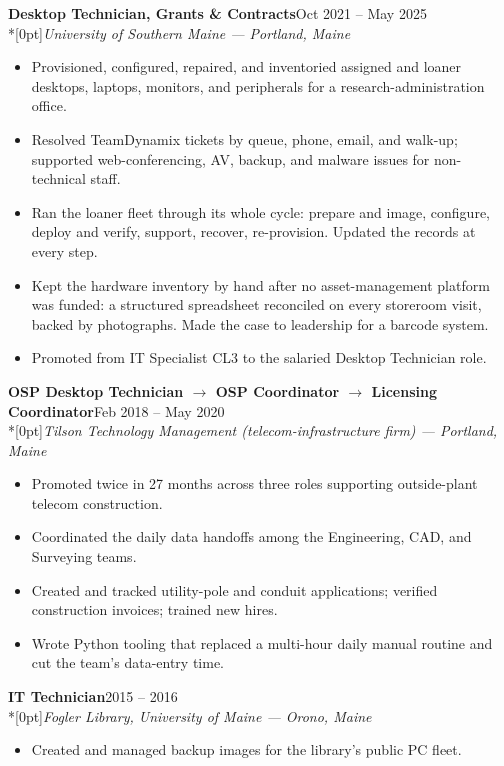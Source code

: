 \documentclass[10pt,letterpaper]{article}
\newcommand{\sect}[1]{\vspace{6pt}{\scshape\textls[60]{#1}}\par\vspace{-2pt}}
\newcommand{\job}[3]{\vspace{3pt}\textbf{#1}\hfill #2\\*[0pt]\textit{#3}\par\vspace{-3pt}}
\begin{document}
\sect{Experience}

\job{Desktop Technician, Grants \& Contracts}{Oct 2021 -- May 2025}{University of Southern Maine --- Portland, Maine}
\begin{itemize}
  \item Provisioned, configured, repaired, and inventoried assigned and loaner desktops, laptops, monitors, and peripherals for a research-administration office.
  \item Resolved TeamDynamix tickets by queue, phone, email, and walk-up; supported web-conferencing, AV, backup, and malware issues for non-technical staff.
  \item Ran the loaner fleet through its whole cycle: prepare and image, configure, deploy and verify, support, recover, re-provision. Updated the records at every step.
  \item Kept the hardware inventory by hand after no asset-management platform was funded: a structured spreadsheet reconciled on every storeroom visit, backed by photographs. Made the case to leadership for a barcode system.
  \item Promoted from IT Specialist CL3 to the salaried Desktop Technician role.
\end{itemize}

\job{OSP Desktop Technician $\rightarrow$ OSP Coordinator $\rightarrow$ Licensing Coordinator}{Feb 2018 -- May 2020}{Tilson Technology Management (telecom-infrastructure firm) --- Portland, Maine}
\begin{itemize}
  \item Promoted twice in 27 months across three roles supporting outside-plant telecom construction.
  \item Coordinated the daily data handoffs among the Engineering, CAD, and Surveying teams.
  \item Created and tracked utility-pole and conduit applications; verified construction invoices; trained new hires.
  \item Wrote Python tooling that replaced a multi-hour daily manual routine and cut the team's data-entry time.
\end{itemize}

\job{IT Technician}{2015 -- 2016}{Fogler Library, University of Maine --- Orono, Maine}
\begin{itemize}
  \item Created and managed backup images for the library's public PC fleet.
\end{itemize}
\end{document}
